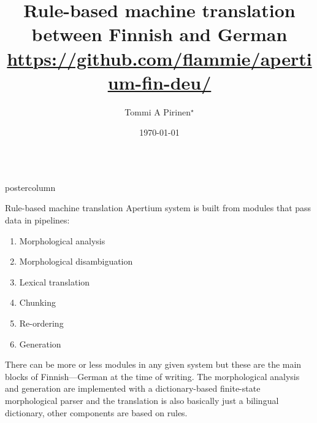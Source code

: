 \documentclass[final,hyperref={pdfpagelabels}]{beamer}
\title[Apertium-fin-deu]{{\huge Rule-based machine translation between
Finnish and German}\\
\url{https://github.com/flammie/apertium-fin-deu/}}
\author[tommi.pirinen@uni-hamburg.de]{Tommi A Pirinen$^\star$}
\institute[UHH]{$^\star$ Universität Hamburg---Hamburger Zentrum für Sprachkorpora}
\date{\today}
\newlength{\columnheight}
\begin{document}
\begin{frame}
      \maketitle
      \vfill
      \begin{columns}
      \begin{column}{.49\textwidth}
      \begin{beamercolorbox}[center,wd=\textwidth]{postercolumn}
          \begin{minipage}[T]{.95\textwidth}  %
          \parbox[t][\columnheight]{\textwidth}{ %
        \begin{block}{Rule-based machine translation}
            Apertium system is built from modules that pass data in pipelines:
            \begin{enumerate}
                \item Morphological analysis
                \item Morphological disambiguation
                \item Lexical translation
                \item Chunking
                \item Re-ordering
                \item Generation
            \end{enumerate}
            There can be more or less modules in any given system but these
            are the main blocks of Finnish---German at the time of writing.
            The morphological analysis and generation are implemented with
            a dictionary-based finite-state morphological parser and the
            translation is also basically just a bilingual dictionary, other
            components are based on rules.
        \end{block}

}
\end{minipage}
\end{beamercolorbox}
\end{column}
\end{columns}
\end{frame}
\end{document}
